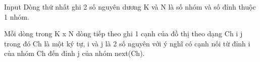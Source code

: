 Input
Dòng thứ nhất ghi 2 số nguyên dương K và N là số nhóm và số đỉnh thuộc 1 nhóm.  

   Mỗi dòng trong K x N dòng tiếp theo ghi 1 cạnh của đồ thị theo dạng Ch i j trong đó Ch là một ký tự, i và j là 2 số nguyên với ý nghĩ có cạnh nối từ đỉnh i của nhóm Ch đến đỉnh j của nhóm next(Ch).